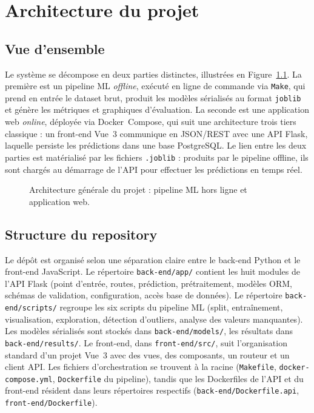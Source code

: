 \documentclass[12pt,a4paper,openany]{report}
\newcommand{\tool}[1]{\texttt{#1}}
\newcommand{\file}[1]{\texttt{#1}}
\begin{document}
\chapter{Architecture du projet}

\section{Vue d'ensemble}

Le système se décompose en deux parties distinctes, illustrées en Figure~\ref{fig:architecture}. La première est un pipeline ML \emph{offline}, exécuté en ligne de commande via \tool{Make}, qui prend en entrée le dataset brut, produit les modèles sérialisés au format \tool{joblib} et génère les métriques et graphiques d'évaluation. La seconde est une application web \emph{online}, déployée via Docker~Compose, qui suit une architecture trois tiers classique : un front-end Vue~3 communique en JSON/REST avec une API Flask, laquelle persiste les prédictions dans une base PostgreSQL. Le lien entre les deux parties est matérialisé par les fichiers \texttt{.joblib} : produits par le pipeline offline, ils sont chargés au démarrage de l'API pour effectuer les prédictions en temps réel.

\begin{figure}[H]
    \centering
    
    \caption{Architecture générale du projet : pipeline ML hors ligne et application web.}
    \label{fig:architecture}
\end{figure}

\section{Structure du repository}

Le dépôt est organisé selon une séparation claire entre le back-end Python et le front-end JavaScript. Le répertoire \file{back-end/app/} contient les huit modules de l'API Flask (point d'entrée, routes, prédiction, prétraitement, modèles ORM, schémas de validation, configuration, accès base de données). Le répertoire \file{back-end/scripts/} regroupe les six scripts du pipeline ML (split, entraînement, visualisation, exploration, détection d'outliers, analyse des valeurs manquantes). Les modèles sérialisés sont stockés dans \file{back-end/models/}, les résultats dans \file{back-end/results/}. Le front-end, dans \file{front-end/src/}, suit l'organisation standard d'un projet Vue~3 avec des vues, des composants, un routeur et un client API. Les fichiers d'orchestration se trouvent à la racine (\file{Makefile}, \file{docker-compose.yml}, \file{Dockerfile} du pipeline), tandis que les Dockerfiles de l'API et du front-end résident dans leurs répertoires respectifs (\file{back-end/Dockerfile.api}, \file{front-end/Dockerfile}).
\end{document}
